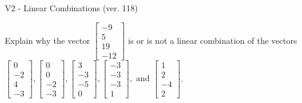 \begin{exercise}
  \begin{exerciseTitle}V2 - Linear Combinations (ver. 118)\end{exerciseTitle}
  \begin{exerciseStatement}
    Explain why the vector \(\left[\begin{array}{c}
-9 \\
5 \\
19 \\
-12
\end{array}\right]\)  is or is not a linear 
	combination of the vectors \(\left[\begin{array}{c}
0 \\
-2 \\
4 \\
-3
\end{array}\right] , \left[\begin{array}{c}
0 \\
0 \\
-2 \\
-3
\end{array}\right] , \left[\begin{array}{c}
3 \\
-3 \\
-5 \\
0
\end{array}\right] , \left[\begin{array}{c}
-3 \\
-3 \\
-3 \\
1
\end{array}\right] , \text{ and } \left[\begin{array}{c}
1 \\
2 \\
-4 \\
2
\end{array}\right]\).
	



\end{exerciseStatement}
\end{exercise}
